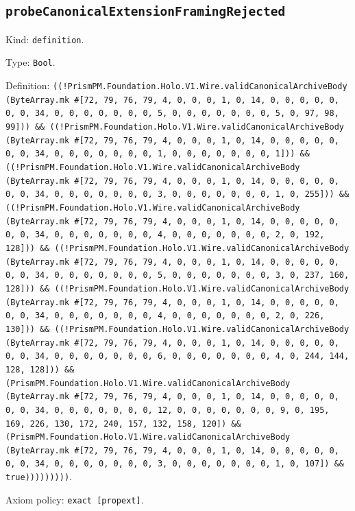\documentclass[11pt]{article}
\begin{document}
\subsection*{\texttt{probeCanonicalExtensionFramingRejected}}
\noindent Kind: \texttt{definition}.\par
\noindent Type: \texttt{Bool}.\par
\noindent Definition: \texttt{((!PrismPM.Foundation.Holo.V1.Wire.validCanonicalArchiveBody (ByteArray.mk \#[72, 79, 76, 79, 4, 0, 0, 0, 1, 0, 14, 0, 0, 0, 0, 0, 0, 0, 34, 0, 0, 0, 0, 0, 0, 0, 5, 0, 0, 0, 0, 0, 0, 0, 5, 0, 97, 98, 99])) \&\& ((!PrismPM.Foundation.Holo.V1.Wire.validCanonicalArchiveBody (ByteArray.mk \#[72, 79, 76, 79, 4, 0, 0, 0, 1, 0, 14, 0, 0, 0, 0, 0, 0, 0, 34, 0, 0, 0, 0, 0, 0, 0, 1, 0, 0, 0, 0, 0, 0, 0, 1])) \&\& ((!PrismPM.Foundation.Holo.V1.Wire.validCanonicalArchiveBody (ByteArray.mk \#[72, 79, 76, 79, 4, 0, 0, 0, 1, 0, 14, 0, 0, 0, 0, 0, 0, 0, 34, 0, 0, 0, 0, 0, 0, 0, 3, 0, 0, 0, 0, 0, 0, 0, 1, 0, 255])) \&\& ((!PrismPM.Foundation.Holo.V1.Wire.validCanonicalArchiveBody (ByteArray.mk \#[72, 79, 76, 79, 4, 0, 0, 0, 1, 0, 14, 0, 0, 0, 0, 0, 0, 0, 34, 0, 0, 0, 0, 0, 0, 0, 4, 0, 0, 0, 0, 0, 0, 0, 2, 0, 192, 128])) \&\& ((!PrismPM.Foundation.Holo.V1.Wire.validCanonicalArchiveBody (ByteArray.mk \#[72, 79, 76, 79, 4, 0, 0, 0, 1, 0, 14, 0, 0, 0, 0, 0, 0, 0, 34, 0, 0, 0, 0, 0, 0, 0, 5, 0, 0, 0, 0, 0, 0, 0, 3, 0, 237, 160, 128])) \&\& ((!PrismPM.Foundation.Holo.V1.Wire.validCanonicalArchiveBody (ByteArray.mk \#[72, 79, 76, 79, 4, 0, 0, 0, 1, 0, 14, 0, 0, 0, 0, 0, 0, 0, 34, 0, 0, 0, 0, 0, 0, 0, 4, 0, 0, 0, 0, 0, 0, 0, 2, 0, 226, 130])) \&\& ((!PrismPM.Foundation.Holo.V1.Wire.validCanonicalArchiveBody (ByteArray.mk \#[72, 79, 76, 79, 4, 0, 0, 0, 1, 0, 14, 0, 0, 0, 0, 0, 0, 0, 34, 0, 0, 0, 0, 0, 0, 0, 6, 0, 0, 0, 0, 0, 0, 0, 4, 0, 244, 144, 128, 128])) \&\& (PrismPM.Foundation.Holo.V1.Wire.validCanonicalArchiveBody (ByteArray.mk \#[72, 79, 76, 79, 4, 0, 0, 0, 1, 0, 14, 0, 0, 0, 0, 0, 0, 0, 34, 0, 0, 0, 0, 0, 0, 0, 12, 0, 0, 0, 0, 0, 0, 0, 9, 0, 195, 169, 226, 130, 172, 240, 157, 132, 158, 120]) \&\& (PrismPM.Foundation.Holo.V1.Wire.validCanonicalArchiveBody (ByteArray.mk \#[72, 79, 76, 79, 4, 0, 0, 0, 1, 0, 14, 0, 0, 0, 0, 0, 0, 0, 34, 0, 0, 0, 0, 0, 0, 0, 3, 0, 0, 0, 0, 0, 0, 0, 1, 0, 107]) \&\& true)))))))))}.\par
\noindent Axiom policy: \texttt{exact [propext]}.\par
\end{document}

